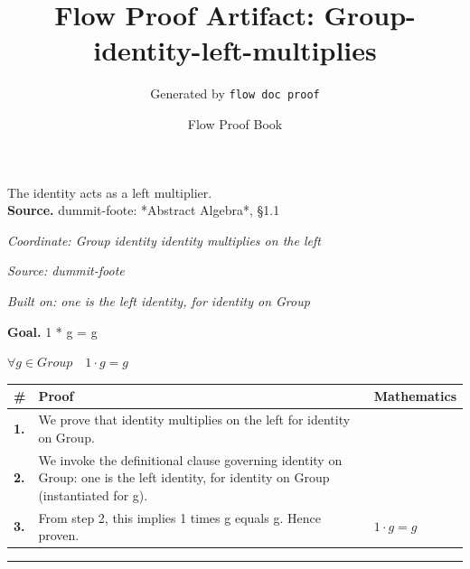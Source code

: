 \documentclass[11pt]{article}
\title{Flow Proof Artifact: Group-identity-left-multiplies}
\author{Generated by \texttt{flow doc proof}}
\date{Flow Proof Book}
\theoremstyle{definition}
\begin{document}
\maketitle
The identity acts as a left multiplier.\\[0.5em]
\textbf{Source.} dummit-foote: *Abstract Algebra*, §1.1\\[0.5em]
\bigskip
{}\par
\smallskip\noindent\textit{Coordinate: Group \cdot identity \cdot identity multiplies on the left}\par
\smallskip\noindent\textit{Source: dummit-foote}\par
\smallskip\noindent\textit{Built on: one is the left identity, for identity on Group}\par
\medskip
\noindent\textbf{Goal.} 1 * g = g\par
\noindent$\displaystyle \forall g \in Group\quad 1 \cdot g = g$\par
\medskip
\noindent
\begin{tabular}{@{} >{\raggedright\arraybackslash}p{} >{\raggedright\arraybackslash}p{} >{\raggedleft\arraybackslash}p{} @{}}
\textbf{\#} & \textbf{Proof} & \textbf{Mathematics} \\
\midrule
\textbf{1.} & We prove that identity multiplies on the left for identity on Group. & \\[0.45em]
\textbf{2.} & We invoke the definitional clause governing identity on Group: one is the left identity, for identity on Group (instantiated for g). & \\[0.45em]
\textbf{3.} & From step 2, this implies 1 times g equals g. Hence proven. & $\displaystyle 1 \cdot g = g$ \\[0.45em]
\bottomrule
\end{tabular}
\label{thm:Group-identity-identity_multiplies_on_the_left}
\par\medskip\hrule
\end{document}
